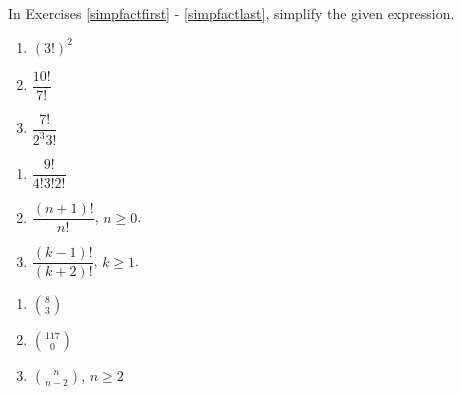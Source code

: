 \documentclass{ximera}
\begin{document}
	\author{Stitz-Zeager}



In Exercises \ref{simpfactfirst} - \ref{simpfactlast},  simplify the given expression.

\begin{multicols}{3}
\begin{enumerate}

\item  $\left(3!\right)^2$ \label{simpfactfirst}


\item  $\dfrac{10!}{7!}$


\item  $\dfrac{7!}{2^3 3!}$

\setcounter{HW}{\value{enumi}}
\end{enumerate}
\end{multicols}

\begin{multicols}{3}
\begin{enumerate}
\setcounter{enumi}{\value{HW}}



\item  $\dfrac{9!}{4! 3! 2!}$


\item  $\dfrac{(n+1)!}{n!}$, $n \geq 0$.


\item  $\dfrac{(k-1)!}{(k+2)!}$, $k \geq 1$.

\setcounter{HW}{\value{enumi}}
\end{enumerate}
\end{multicols}

\begin{multicols}{3}
\begin{enumerate}
\setcounter{enumi}{\value{HW}}



\item  $\displaystyle{\binom{8}{3}}$


\item  $\displaystyle{\binom{117}{0}}$


\item  $\displaystyle{\binom{n}{n-2}}$, $n \geq 2$ \label{simpfactlast}


\setcounter{HW}{\value{enumi}}
\end{enumerate}
\end{multicols}
\end{document}
